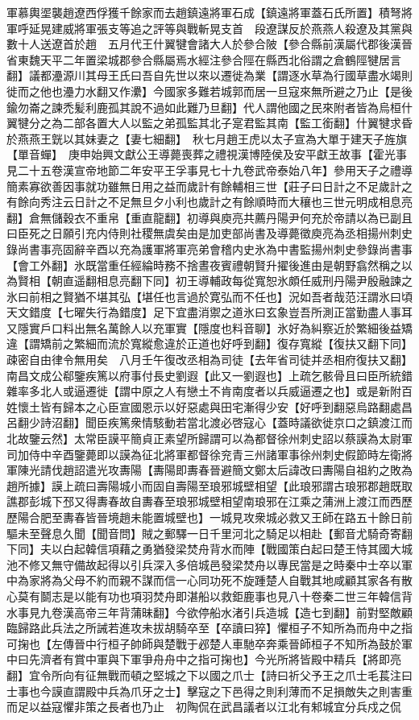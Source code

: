 軍慕輿埿襲趙遼西俘獲千餘家而去趙鎮遠將軍石成【鎮遠將軍蓋石氏所置】積弩將軍呼延晃建威將軍張支等追之評等與戰斬晃支首　段遼謀反於燕燕人殺遼及其黨與數十人送遼首於趙　五月代王什翼犍會諸大人於參合陂【參合縣前漢屬代郡後漢晉省東魏天平二年置梁城郡參合縣屬焉水經注參合陘在縣西北俗謂之倉鶴陘犍居言翻】議都灅源川其母王氏曰吾自先世以來以遷徙為業【謂逐水草為行國草盡水竭則徙而之他也灅力水翻又作㶟】今國家多難若城郭而居一旦寇來無所避之乃止【是後鍮勿崙之諫禿髪利鹿孤其說不過如此難乃旦翻】代人謂他國之民來附者皆為烏桓什翼犍分之為二部各置大人以監之弟孤監其北子寔君監其南【監工銜翻】什翼犍求昏於燕燕王皝以其妹妻之【妻七細翻】　秋七月趙王虎以太子宣為大單于建天子旌旗【單音蟬】　庚申始興文獻公王導薨喪葬之禮視漢博陸侯及安平獻王故事【霍光事見二十五卷漢宣帝地節二年安平王孚事見七十九卷武帝泰始八年】參用天子之禮導簡素寡欲善因事就功雖無日用之益而歲計有餘輔相三世【莊子曰日計之不足歲計之有餘向秀注云日計之不足無旦夕小利也歲計之有餘順時而大穰也三世元明成相息亮翻】倉無儲穀衣不重帛【重直龍翻】初導與庾亮共薦丹陽尹何充於帝請以為已副且曰臣死之日願引充内侍則社稷無虞矣由是加吏部尚書及導薨徵庾亮為丞相揚州刺史錄尚書事亮固辭辛酉以充為護軍將軍亮弟會稽内史氷為中書監揚州刺史參錄尚書事【會工外翻】氷既當重任經綸時務不捨晝夜賓禮朝賢升擢後進由是朝野翕然稱之以為賢相【朝直遥翻相息亮翻下同】初王導輔政每從寬恕氷頗任威刑丹陽尹殷融諫之氷曰前相之賢猶不堪其弘【堪任也言過於寛弘而不任也】況如吾者哉范汪謂氷曰頃天文錯度【七曜失行為錯度】足下宜盡消禦之道氷曰玄象豈吾所測正當勤盡人事耳又隱實戶口料出無名萬餘人以充軍實【隱度也料音聊】氷好為糾察近於繁細後益矯違【謂矯前之繁細而流於寬縱愈違於正道也好呼到翻】復存寬縱【復扶又翻下同】疎密自由律令無用矣　八月壬午復改丞相為司徒【去年省司徒并丞相府復扶又翻】　南昌文成公郗鑒疾篤以府事付長史劉遐【此又一劉遐也】上疏乞骸骨且曰臣所統錯雜率多北人或逼遷徙【謂中原之人有戀土不肯南度者以兵威逼遷之也】或是新附百姓懷土皆有歸本之心臣宣國恩示以好惡處與田宅漸得少安【好呼到翻惡烏路翻處昌呂翻少詩沼翻】聞臣疾篤衆情駭動若當北渡必啓寇心【蓋時議欲徙京口之鎮渡江而北故鑒云然】太常臣謨平簡貞正素望所歸謂可以為都督徐州刺史詔以蔡謨為太尉軍司加侍中辛酉鑒薨即以謨為征北將軍都督徐兖青三州諸軍事徐州刺史假節時左衛將軍陳光請伐趙詔遣光攻夀陽【夀陽即夀春晉避簡文鄭太后諱改曰夀陽自祖約之敗為趙所據】謨上疏曰壽陽城小而固自壽陽至琅邪城壁相望【此琅邪謂古琅邪郡趙既取譙郡彭城下邳又得夀春故自夀春至琅邪城壁相望南琅邪在江乘之蒲洲上渡江而西歷歷陽合肥至夀春皆晉境趙未能置城壁也】一城見攻衆城必救又王師在路五十餘日前驅未至聲息久聞【聞音問】賊之郵驛一日千里河北之騎足以相赴【郵音尤騎奇寄翻下同】夫以白起韓信項藉之勇猶發梁焚舟背水而陣【戰國策白起曰楚王恃其國大城池不修又無守備故起得以引兵深入多倍城邑發梁焚舟以專民當是之時秦中士卒以軍中為家將為父母不約而親不謀而信一心同功死不旋踵楚人自戰其地咸顧其家各有散心莫有鬬志是以能有功也項羽焚舟即湛船以救鉅鹿事也見八十卷秦二世三年韓信背水事見九卷漢高帝三年背蒲昧翻】今欲停船水渚引兵造城【造七到翻】前對堅敵顧臨歸路此兵法之所誡若進攻未拔胡騎卒至【卒讀曰猝】懼桓子不知所為而舟中之指可掬也【左傳晉中行桓子帥師與楚戰于邲楚人車馳卒奔乘晉師桓子不知所為鼓於軍中曰先濟者有賞中軍與下軍爭舟舟中之指可掬也】今光所將皆殿中精兵【將即亮翻】宜令所向有征無戰而頓之堅城之下以國之爪士【詩曰祈父予王之爪士毛萇注曰士事也今謨直謂殿中兵為爪牙之士】擊寇之下邑得之則利薄而不足損敵失之則害重而足以益寇懼非策之長者也乃止　初陶侃在武昌議者以江北有邾城宜分兵戍之侃